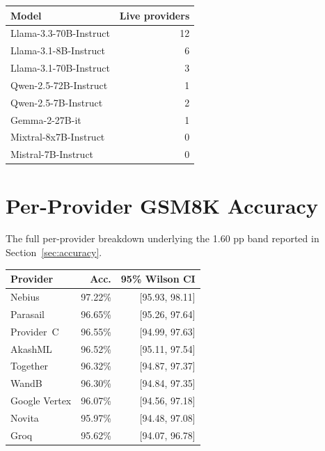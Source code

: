 \documentclass[11pt]{article}
\begin{document}
\begin{center}
\small
\begin{tabular}{lr}
\toprule
\textbf{Model} & \textbf{Live providers} \\
\midrule
Llama-3.3-70B-Instruct    & 12 \\
Llama-3.1-8B-Instruct     & 6 \\
Llama-3.1-70B-Instruct    & 3 \\
Qwen-2.5-72B-Instruct     & 1 \\
Qwen-2.5-7B-Instruct      & 2 \\
Gemma-2-27B-it            & 1 \\
Mixtral-8x7B-Instruct     & 0 \\
Mistral-7B-Instruct       & 0 \\
\bottomrule
\end{tabular}
\label{tab:models}
\end{center}

\section{Per-Provider GSM8K Accuracy}
\label{app:gsm8k}

The full per-provider breakdown underlying the 1.60 pp band reported in
Section~\ref{sec:accuracy}.

\begin{center}
\small
\begin{tabular}{lrr}
\toprule
\textbf{Provider} & \textbf{Acc.} & \textbf{95\% Wilson CI} \\
\midrule
Nebius        & 97.22\% & [95.93, 98.11] \\
Parasail      & 96.65\% & [95.26, 97.64] \\
Provider~C    & 96.55\% & [94.99, 97.63] \\
AkashML       & 96.52\% & [95.11, 97.54] \\
Together      & 96.32\% & [94.87, 97.37] \\
WandB         & 96.30\% & [94.84, 97.35] \\
Google Vertex & 96.07\% & [94.56, 97.18] \\
Novita        & 95.97\% & [94.48, 97.08] \\
Groq          & 95.62\% & [94.07, 96.78] \\
\bottomrule
\end{tabular}
\label{tab:gsm8k_full}
\end{center}
\end{document}
